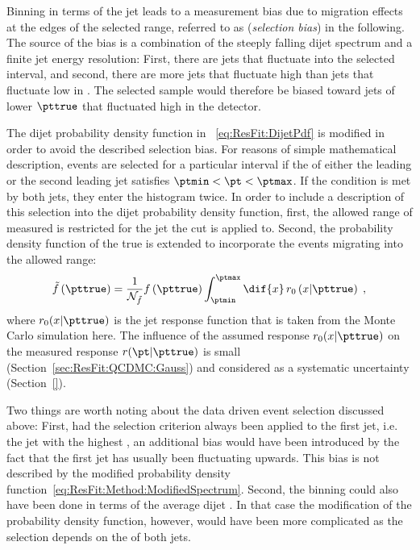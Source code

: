 Binning in terms of the jet \pt leads to a measurement bias due to migration effects at the edges of 
the selected \pt range, referred to as (\textit{selection bias}) in the following.
The source of the bias is a combination of the steeply falling dijet \pt spectrum and a finite jet energy resolution:
First, there are jets that fluctuate into the selected \pt interval, and second, there are more jets that fluctuate high than jets that fluctuate low in \pt.
The selected sample would therefore be biased toward jets of lower $\pttrue$ that fluctuated high in the detector.

The dijet probability density function in ~\eqref{eq:ResFit:DijetPdf} is modified in order to avoid the described selection bias.
For reasons of simple mathematical description, events are selected for a particular interval if the \pt of either the leading or the second leading jet satisfies $\ptmin < \pt < \ptmax$.
If the condition is met by both jets, they enter the histogram twice.
In order to include a description of this selection into the dijet probability density function, first, the allowed range of measured \pt is restricted for the jet the \pt cut is applied to.
Second, the probability density function of the true \pt is extended to incorporate the events migrating into the allowed \pt range:
\begin{equation}
  \label{eq:ResFit:Method:ModifiedSpectrum}
  \tilde{f}\left(\pttrue\right) = \frac{1}{\mathcal{N}_{\tilde{f}}}
  f\left(\pttrue\right) \int^{\ptmax}_{\ptmin}\dif{x}\,r_{0}\left(x|\pttrue\right) \; ,
\end{equation}
where $r_{0}(x|\pttrue)$ is the jet \pt response function that is taken from the Monte Carlo simulation here.
The influence of the assumed response $r_{0}(x|\pttrue)$ on the measured response $r(\pt|\pttrue)$ is small (Section~\ref{sec:ResFit:QCDMC:Gauss}) and considered as a systematic uncertainty (Section~\ref{}).

Two things are worth noting about the data driven event selection discussed above:
First, had the selection criterion always been applied to the first
jet, i.e. the jet with the highest \pt, an additional bias would have been introduced by the fact that the first jet has usually been fluctuating upwards.
This bias is not described by the modified probability density function~\eqref{eq:ResFit:Method:ModifiedSpectrum}.
Second, the binning could also have been done in terms of the average dijet \pt.
In that case the modification of the probability density function,
however, would have been more complicated as the selection depends on
the \pt of both jets.

